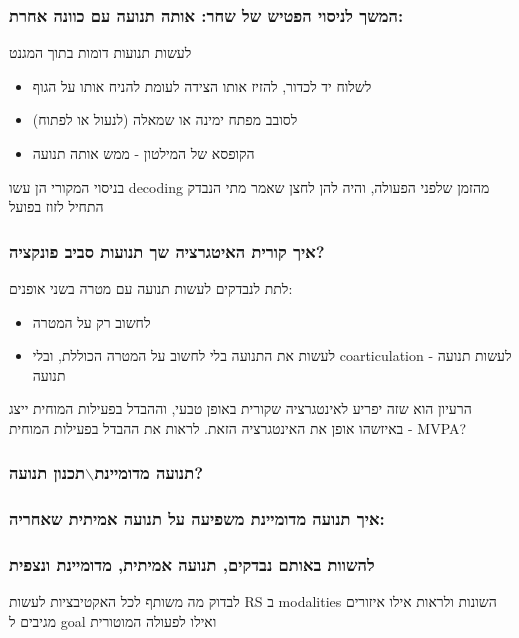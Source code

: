 \documentclass[11pt]{article}
\begin{document}
\subsubsection{המשך לניסוי הפטיש של שחר: אותה תנועה עם כוונה אחרת:}
\label{sec:orgee2b1c4}
לעשות תנועות דומות בתוך המגנט
\begin{itemize}
\item לשלוח יד לכדור, להזיז אותו הצידה לעומת להניח אותו על הגוף
\item לסובב מפתח ימינה או שמאלה (לנעול או לפתוח)
\item הקופסא של המילטון - ממש אותה תנועה
\end{itemize}

בניסוי המקורי הן עשו decoding מהזמן שלפני הפעולה, והיה להן לחצן שאמר מתי הנבדק התחיל לזוז בפועל

\subsubsection{איך קורית האיטגרציה שך תנועות סביב פונקציה?}
\label{sec:org392831e}
לתת לנבדקים לעשות תנועה עם מטרה בשני אופנים:
\begin{itemize}
\item לחשוב רק על המטרה
\item לעשות את התנועה בלי לחשוב על המטרה הכוללת, ובלי coarticulation - לעשות תנועה תנועה
\end{itemize}

הרעיון הוא שזה יפריע לאינטגרציה שקורית באופן טבעי, וההבדל בפעילות המוחית ייצג באיזשהו אופן את האינטגרציה הזאת.
לראות את ההבדל בפעילות המוחית - MVPA?
\subsubsection{תנועה מדומיינת$\backslash$תכנון תנועה?}
\label{sec:org5bc8545}

\subsubsection{איך תנועה מדומיינת משפיעה על תנועה אמיתית שאחריה: \autocite{persichettiLayerSpecificContributionsImagined2020}}
\label{sec:org7d4231e}

\subsubsection{להשוות באותם נבדקים, תנועה אמיתית, מדומיינת ונצפית}
\label{sec:orgb98a36d}
לבדוק מה משותף לכל האקטיבציות
לעשות RS ב modalities השונות ולראות אילו איזורים מגיבים ל goal ואילו לפעולה המוטורית
\end{document}
